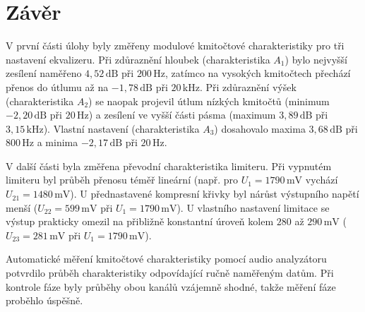 \documentclass[a4paper, czech]{article}
\begin{document}
\section{Závěr}

V první části úlohy byly změřeny modulové kmitočtové charakteristiky pro tři nastavení ekvalizeru.
Při zdůraznění hloubek (charakteristika $A_1$) bylo nejvyšší zesílení naměřeno $4{,}52\,\text{dB}$ při $200\,\text{Hz}$, zatímco na vysokých kmitočtech přechází přenos do útlumu až na $-1{,}78\,\text{dB}$ při $20\,\text{kHz}$.
Při zdůraznění výšek (charakteristika $A_2$) se naopak projevil útlum nízkých kmitočtů (minimum $-2{,}20\,\text{dB}$ při $20\,\text{Hz}$) a zesílení ve vyšší části pásma (maximum $3{,}89\,\text{dB}$ při $3{,}15\,\text{kHz}$).
Vlastní nastavení (charakteristika $A_3$) dosahovalo maxima $3{,}68\,\text{dB}$ při $800\,\text{Hz}$ a minima $-2{,}17\,\text{dB}$ při $20\,\text{Hz}$.

V další části byla změřena převodní charakteristika limiteru.
Při vypnutém limiteru byl průběh přenosu téměř lineární (např. pro $U_1 = 1790\,\text{mV}$ vychází $U_{21} = 1480\,\text{mV}$).
U přednastavené kompresní křivky byl nárůst výstupního napětí menší ($U_{22} = 599\,\text{mV}$ při $U_1 = 1790\,\text{mV}$).
U vlastního nastavení limitace se výstup prakticky omezil na přibližně konstantní úroveň kolem $280$ až $290\,\text{mV}$ ($U_{23} = 281\,\text{mV}$ při $U_1 = 1790\,\text{mV}$).

Automatické měření kmitočtové charakteristiky pomocí audio analyzátoru potvrdilo průběh charakteristiky odpovídající ručně naměřeným datům.
Při kontrole fáze byly průběhy obou kanálů vzájemně shodné, takže měření fáze proběhlo úspěšně.
\end{document}
